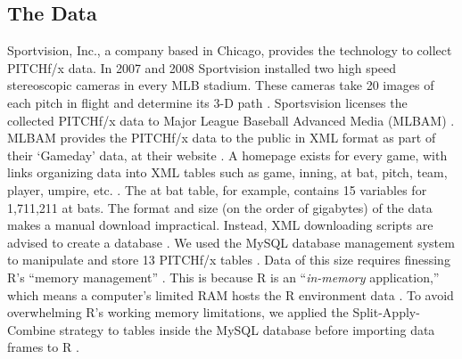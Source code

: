 \documentclass{article}
\begin{document}
\subsection{The Data} %
Sportvision, Inc., a company based in Chicago, provides the technology to collect PITCHf/x\textsuperscript{\textregistered} data. In 2007 and 2008 Sportvision installed two high speed stereoscopic cameras in every MLB\textsuperscript{\textregistered} stadium. These cameras take 20 images of each pitch in flight and determine its 3-D path \citep{Fast2010}. Sportsvision licenses the collected PITCHf/x\textsuperscript{\textregistered} data to Major League Baseball Advanced Media (MLBAM\textsuperscript{\textregistered}) \citep{Baumer2010}. MLBAM\textsuperscript{\textregistered} provides the PITCHf/x\textsuperscript{\textregistered} data to the public in XML format as part of  their  `Gameday' data, at their website \citep{Sievert2014}. A homepage exists for every game, with links organizing data into XML tables such as game, inning, at bat, pitch, team, player, umpire, etc. \citep{Sievert2014}. The at bat table, for example, contains 15 variables for 1,711,211 at bats. The format and size (on the order of gigabytes) of the data makes a manual download impractical. Instead, XML downloading scripts are advised to create a database \citep{Adler2006}. We used the MySQL database management system  to manipulate and store 13 PITCHf/x\textsuperscript{\textregistered} tables \citep{Tahaghoghi2006}. Data of this size requires finessing R's ``memory management'' \citep{Wickham2014}. This is because R is an ``{\it in-memory} application,'' which means a computer's limited RAM hosts the R environment data \citep{Smith2013}. To avoid overwhelming R's working memory limitations, we applied the Split-Apply-Combine strategy to tables inside the MySQL database before importing data frames to R \citep{Wickham2011}.
\end{document}
